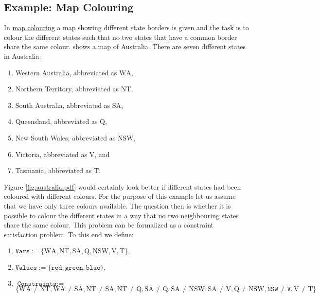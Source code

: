 \subsection{Example: Map Colouring}
In \href{https://en.wikipedia.org/wiki/Four_color_theorem}{map colouring} a map showing different state
borders is given and the task is to colour the different states such that no two states that have a common
border share the same colour.   shows a map of Australia.  There are seven different
states in Australia:
\begin{enumerate}
\item Western Australia, abbreviated as $\mathrm{WA}$,
\item Northern Territory, abbreviated as $\mathrm{NT}$,
\item South Australia, abbreviated as $\mathrm{SA}$,
\item Queensland, abbreviated as $\mathrm{Q}$,
\item New South Wales, abbreviated as $\mathrm{NSW}$,
\item Victoria, abbreviated as $\mathrm{V}$, and
\item Tasmania, abbreviated as $\mathrm{T}$.
\end{enumerate}
Figure \ref{fig:australia.pdf} would certainly look better if different states had been coloured with different
colours.  For the purpose of 
this example let us assume that we have only three colours available.  The question then is whether it is 
possible to colour the different states in a way that no two neighbouring states share the same colour.  This
problem can be formalized as a constraint satisfaction problem.  To this end we define:
\begin{enumerate}
\item $\texttt{Vars} := \{ \mathrm{WA}, \mathrm{NT}, \mathrm{SA}, \mathrm{Q}, \mathrm{NSW}, \mathrm{V}, \mathrm{T} \}$,
\item $\texttt{Values} := \{ \texttt{red}, \texttt{green}, \texttt{blue} \}$,
\item $\texttt{Constraints} := $ \\[0.1cm]
      \hspace*{0.3cm}
      $\bigl\{ \mathrm{WA} \not= \mathrm{NT}, \mathrm{WA} \not= \mathrm{SA},
                 \mathrm{NT} \not= \mathrm{SA}, \mathrm{NT} \not= \mathrm{Q},
                 \mathrm{SA} \not= \mathrm{Q},  \mathrm{SA} \not= \mathrm{NSW}, \mathrm{SA} \not= \mathrm{V}, 
                 \mathrm{Q}  \not= \mathrm{NSW},
                 \mathtt{NSW}\not= \mathtt{V}, 
                 \mathrm{V}  \not= \mathrm{T}
       \bigr\}
      $
\end{enumerate}
